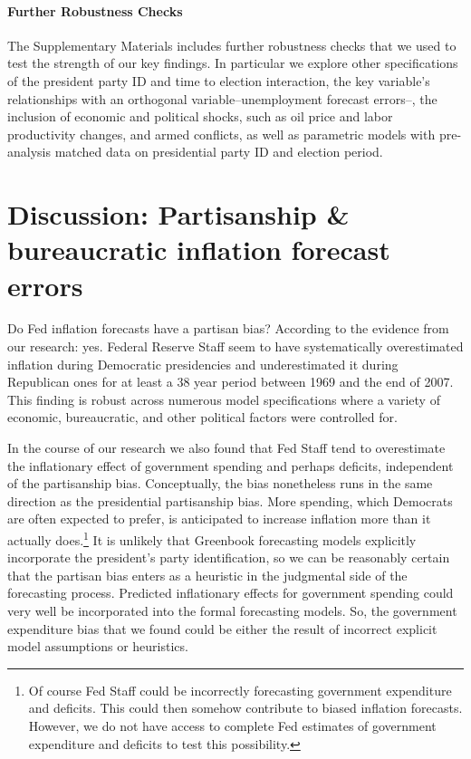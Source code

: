 \documentclass[a4paper]{article}\usepackage[]{graphicx}\usepackage[]{color}
\begin{document}
\paragraph{Further Robustness Checks}

The Supplementary Materials includes further robustness checks that we used to test the strength of our key findings. In particular we explore other specifications of the president party ID and time to election interaction, the key variable's relationships with an orthogonal variable--unemployment forecast errors--, the inclusion of economic and political shocks, such as oil price and labor productivity changes, and armed conflicts, as well as parametric models with pre-analysis matched data on presidential party ID and election period. 

\section*{Discussion: Partisanship \& bureaucratic inflation forecast errors}

Do Fed inflation forecasts have a partisan bias? According to the evidence from our research: yes. Federal Reserve Staff seem to have systematically overestimated inflation during Democratic presidencies and underestimated it during Republican ones for at least a 38 year period between 1969 and the end of 2007. This finding is robust across numerous model specifications where a variety of economic, bureaucratic, and other political factors were controlled for. 

In the course of our research we also found that Fed Staff tend to overestimate the inflationary effect of government spending and perhaps deficits, independent of the partisanship bias. Conceptually, the bias nonetheless runs in the same direction as the presidential partisanship bias. More spending, which Democrats are often expected to prefer, is anticipated to increase inflation more than it actually does.\footnote{Of course Fed Staff could be incorrectly forecasting government expenditure and deficits. This could then somehow contribute to biased inflation forecasts. However, we do not have access to complete Fed estimates of government expenditure and deficits to test this possibility.} It is unlikely that Greenbook forecasting models explicitly incorporate the president's party identification, so we can be reasonably certain that the partisan bias enters as a heuristic in the judgmental side of the forecasting process. Predicted inflationary effects for government spending could very well be incorporated into the formal forecasting models. So, the government expenditure bias that we found could be either the result of incorrect explicit model assumptions or heuristics.
\end{document}
